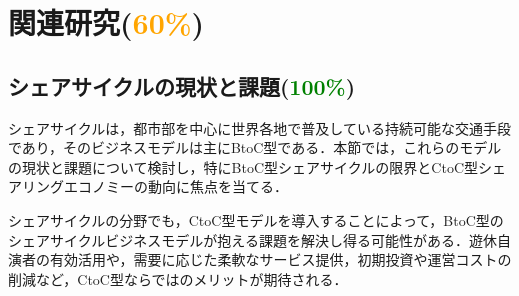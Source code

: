 \section{関連研究(\textcolor{orange}{60\%})}
  \label{sec:関連研究}
    \par
  
  \subsection{シェアサイクルの現状と課題(\textcolor{green}{100\%})}
    \label{sec:シェアサイクルの現状と課題}
      \par シェアサイクルは，都市部を中心に世界各地で普及している持続可能な交通手段であり，そのビジネスモデルは主にBtoC型である．本節では，これらのモデルの現状と課題について検討し，特にBtoC型シェアサイクルの限界とCtoC型シェアリングエコノミーの動向に焦点を当てる．
      \par シェアサイクルの分野でも，CtoC型モデルを導入することによって，BtoC型のシェアサイクルビジネスモデルが抱える課題を解決し得る可能性がある．遊休自演者の有効活用や，需要に応じた柔軟なサービス提供，初期投資や運営コストの削減など，CtoC型ならではのメリットが期待される．
      
